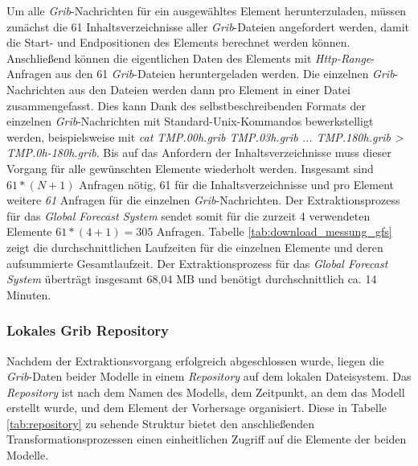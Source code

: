 Um alle \textit{Grib}-Nachrichten für ein ausgewähltes Element
herunterzuladen, müssen zunächst die 61 Inhaltsverzeichnisse aller
\textit{Grib}-Dateien angefordert werden, damit die Start- und
Endpositionen des Elements berechnet werden können. Anschließend
können die eigentlichen Daten des Elements mit
\textit{Http-Range}-Anfragen aus den 61 \textit{Grib}-Dateien
heruntergeladen werden. Die einzelnen \textit{Grib}-Nachrichten aus
den Dateien werden dann pro Element in einer Datei
zusammengefasst. Dies kann Dank des selbstbeschreibenden Formats der
einzelnen \textit{Grib}-Nachrichten mit Standard-Unix-Kommandos
bewerkstelligt werden, beispielsweise mit \textit{cat TMP.00h.grib
  TMP.03h.grib ... TMP.180h.grib > TMP.0h-180h.grib}. Bis auf das
Anfordern der Inhaltsverzeichnisse muss dieser Vorgang für alle
gewünschten Elemente wiederholt werden. Insgesamt sind $ 61 * (N+1) $
Anfragen nötig, 61 für die Inhaltsverzeichnisse und pro Element
weitere \textit{61} Anfragen für die einzelnen
\textit{Grib}-Nachrichten. Der Extraktionsprozess für das
\textit{Global Forecast System} sendet somit für die zurzeit 4
verwendeten Elemente $ 61 * (4+1) = 305$ Anfragen. Tabelle
\ref{tab:download_messung_gfs} zeigt die durchschnittlichen Laufzeiten
für die einzelnen Elemente und deren aufsummierte Gesamtlaufzeit. Der
Extraktionsprozess für das \textit{Global Forecast System} überträgt
insgesamt 68,04 MB und benötigt durchschnittlich ca. 14 Minuten.

\subsubsection{Lokales Grib Repository}
Nachdem der Extraktionsvorgang erfolgreich abgeschlossen wurde, liegen
die \textit{Grib}-Daten beider Modelle in einem \textit{Repository}
auf dem lokalen Dateisystem. Das \textit{Repository} ist nach dem
Namen des Modells, dem Zeitpunkt, an dem das Modell erstellt wurde,
und dem Element der Vorhersage organisiert. Diese in Tabelle
\ref{tab:repository} zu sehende Struktur bietet den anschließenden
Transformationsprozessen einen einheitlichen Zugriff auf die Elemente
der beiden Modelle.


